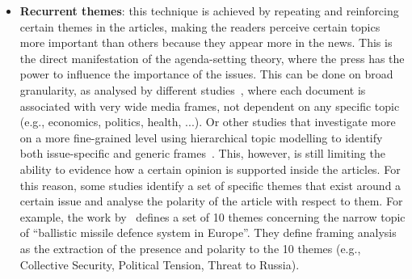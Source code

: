 \begin{itemize}
    \item \textbf{Recurrent themes}: this technique is achieved by repeating and reinforcing certain themes in the articles, making the readers perceive certain topics more important than others because they appear more in the news. This is the direct manifestation of the agenda-setting theory, where the press has the power to influence the importance of the issues.
    This can be done on broad granularity, as analysed by different studies~\cite{tsur2015frame,card2015media}, where each document is associated with very wide media frames, not dependent on any specific topic (e.g., economics, politics, health, ...).
    Or other studies that investigate more on a more fine-grained level using hierarchical topic modelling to identify both issue-specific and generic frames~\cite{boydstun2013making}.
    This, however, is still limiting the ability to evidence how a certain opinion is supported inside the articles. For this reason, some studies identify a set of specific themes that exist around a certain issue and analyse the polarity of the article with respect to them. For example, the work by~\citet{morstatter2018identifying} defines a set of 10 themes concerning the narrow topic of ``ballistic missile defence system in Europe''. %
    They define framing analysis as the extraction of the presence and polarity to the 10 themes (e.g., Collective Security, Political Tension, Threat to Russia).
    
    

\end{itemize}
